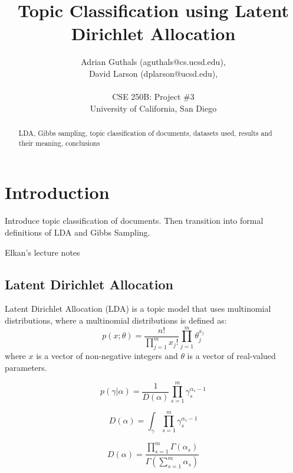 \documentclass[10pt]{article}
\title{Topic Classification using Latent Dirichlet Allocation}
\author{Adrian Guthals (aguthals@cs.ucsd.edu),\\
David Larson (dplarson@ucsd.edu),\\
\\
CSE 250B: Project \#3 \\
University of California, San Diego \\
}
\begin{document}
\maketitle


\begin{abstract}
LDA, Gibbs sampling, topic classification of documents, datasets used, results and their meaning, conclusions
\end{abstract}



\section{Introduction}
\label{sec:intro}

Introduce topic classification of documents. Then transition into formal definitions of LDA and Gibbs Sampling.

Elkan's lecture notes \cite{CSE250B}


\subsection{Latent Dirichlet Allocation}
\label{sec:lda}

Latent Dirichlet Allocation (LDA) is a topic model that uses multinomial distributions, where a multinomial distributions is defined as:
\begin{equation}
    p(x;\theta) = \frac{n!}{\prod_{j=1}^m x_j !} \prod_{j=1}^m \theta_j^{x_j}
\end{equation}
where $x$ is a vector of non-negative integers and $\theta$ is a vector of real-valued parameters.


\begin{equation}
    p(\gamma | \alpha) = \frac{1}{D(\alpha)} \prod_{s=1}^{m} \gamma_{s}^{\alpha_s - 1}
\end{equation}

\begin{equation}
    D(\alpha) = \int_{\gamma} \prod_{s=1}^m \gamma_s^{\alpha_s - 1}
\end{equation}

\begin{equation}
    D(\alpha) = \frac{\prod_{s=1}^m \Gamma(\alpha_s)}{\Gamma (\sum_{s=1}^m \alpha_s )}
\end{equation}
\end{document}
